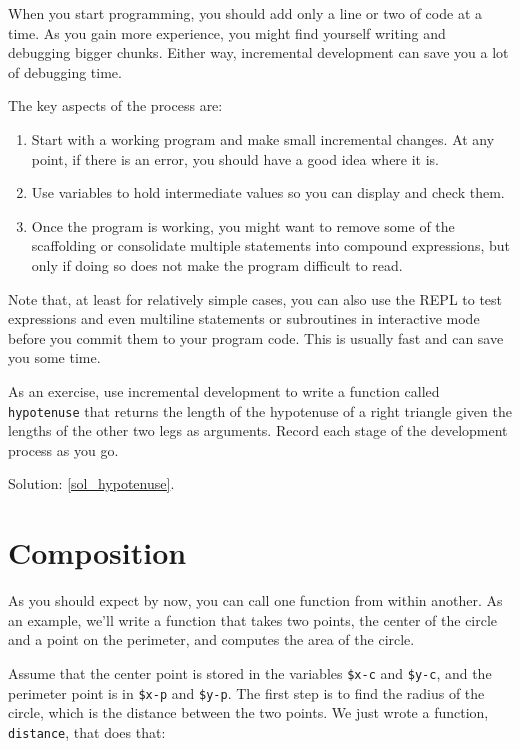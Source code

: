 When you start programming, you should add only a line or two of code at a
time.  As you gain more experience, you might find yourself writing
and debugging bigger chunks.  Either way, incremental development
can save you a lot of debugging time.

The key aspects of the process are:

\begin{enumerate}

\item Start with a working program and make small incremental changes. 
At any point, if there is an error, you should have a good idea
where it is.

\item Use variables to hold intermediate values so you can
display and check them.

\item Once the program is working, you might want to remove some of
the scaffolding or consolidate multiple statements into compound
expressions, but only if doing so does not make the program 
difficult to read.

\end{enumerate}

Note that, at least for relatively simple cases, you can also 
use the REPL to test expressions and even multiline statements 
or subroutines in interactive mode before you commit them to your 
program code. This is usually fast and can save you some time.

\label{hypotenuse}
As an exercise, use incremental development to write a function
called {\tt hypotenuse} that returns the length of the hypotenuse of a
right triangle given the lengths of the other two legs as arguments.
Record each stage of the development process as you go.

Solution: \ref{sol_hypotenuse}.



\section{Composition}

As you should expect by now, you can call one function from within
another.  As an example, we'll write a function that takes two points,
the center of the circle and a point on the perimeter, and computes
the area of the circle.

Assume that the center point is stored in the variables {\tt \$x-c} and
{\tt \$y-c}, and the perimeter point is in {\tt \$x-p} and {\tt \$y-p}. The
first step is to find the radius of the circle, which is the distance
between the two points.  We just wrote a function, {\tt
distance}, that does that:

